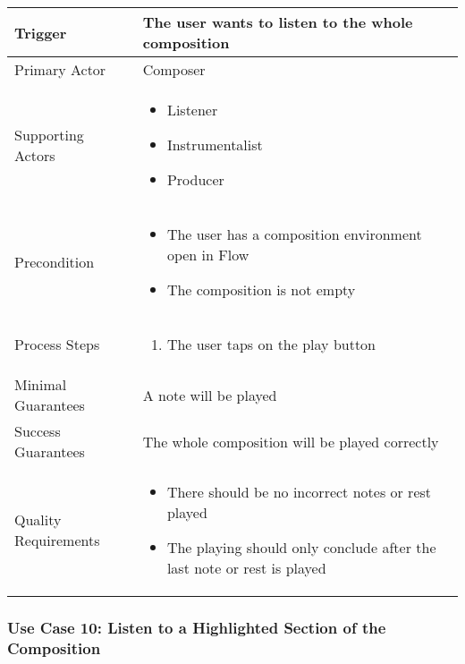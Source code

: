 \begin{tabularx}{\textwidth}{|X|X|}
\hline
Trigger & 
The user wants to listen to the whole composition \\
\hline
Primary Actor & 
Composer \\
\hline
Supporting Actors & 
\begin{itemize}
\item Listener
\item Instrumentalist
\item Producer
\end{itemize} \\
\hline
Precondition & 
\begin{itemize}
\item The user has a composition environment open in Flow
\item The composition is not empty
\end{itemize} \\
\hline
Process Steps & 
\begin{enumerate}
\item The user taps on the play button
\end{enumerate} \\
\hline
Minimal Guarantees & 
A note will be played \\
\hline
Success Guarantees & 
The whole composition will be played correctly \\
\hline
Quality Requirements & 
\begin{itemize}
\item There should be no incorrect notes or rest played
\item The playing should only conclude after the last note or rest is played
\end{itemize} \\ 
\hline
\end{tabularx}

\subsubsection{Use Case 10: Listen to a Highlighted Section of the Composition}


